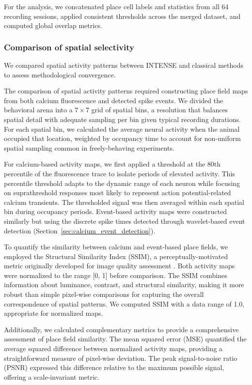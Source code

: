 For the analysis, we concatenated place cell labels and statistics from all 64
recording sessions, applied consistent thresholds across the merged dataset, and
computed global overlap metrics.

\subsubsection{Comparison of spatial selectivity}
\label{sec:comparison_spatial_selectivity}

We compared spatial activity patterns between INTENSE and classical methods
to assess methodological convergence.

The comparison of spatial activity patterns required constructing place field maps
from both calcium fluorescence and detected spike events. We divided the behavioral
arena into a $7 \times 7$ grid of spatial bins, a resolution that balances spatial
detail with adequate sampling per bin given typical recording durations. For each
spatial bin, we calculated the average neural activity when the animal occupied that
location, weighted by occupancy time to account for non-uniform spatial sampling
common in freely-behaving experiments.

For calcium-based activity maps, we first applied a threshold at the 80th percentile
of the fluorescence trace to isolate periods of elevated activity. This percentile
threshold adapts to the dynamic range of each neuron while focusing on
suprathreshold responses most likely to represent action potential-related calcium
transients. The thresholded signal was then averaged within each spatial bin during
occupancy periods. Event-based activity maps were constructed similarly but using
the discrete spike times detected through wavelet-based event detection
(Section~\ref{sec:calcium_event_detection}).

To quantify the similarity between calcium and event-based place fields, we employed
the Structural Similarity Index (SSIM), a perceptually-motivated metric originally
developed for image quality assessment \cite{Wang2004ssim}. Both activity maps were
normalized to the range [0, 1] before comparison. The SSIM combines information
about luminance, contrast, and structural similarity, making it more robust than
simple pixel-wise comparisons for capturing the overall correspondence of spatial
patterns. We computed SSIM with a data range of 1.0, appropriate for normalized
maps.

Additionally, we calculated complementary metrics to provide a comprehensive
assessment of place field similarity. The mean squared error (MSE) quantified the
average squared difference between normalized activity maps, providing a
straightforward measure of pixel-wise deviation. The peak signal-to-noise ratio
(PSNR) expressed this difference relative to the maximum possible signal, offering a
scale-invariant metric.

